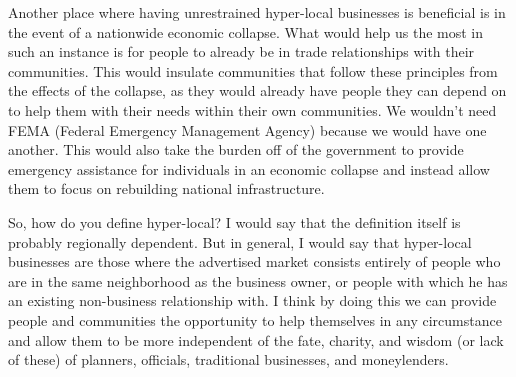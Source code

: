 Another place where having unrestrained hyper-local businesses is
beneficial is in the event of a nationwide economic collapse. What
would help us the
most in such an
instance is for people to already be in trade relationships with their
communities.  This
would insulate
communities that follow these principles from the effects
of the collapse, as
they would already
have people they can depend on
to help them with
their needs within their own communities. We
wouldn’t need FEMA
(Federal Emergency Management Agency) because we
would have one
another. This would
also take the burden off of the government to provide emergency
assistance for individuals in an economic collapse and instead allow
them to focus on rebuilding national
infrastructure.

So, how do you define hyper-local?  I would say that the definition
itself is probably regionally dependent. But in general, I would say
that hyper-local
businesses are those
where the advertised market consists entirely of people who are in the
same neighborhood as the business owner, or people with which he has an
existing non-business relationship with. I think by doing this we can
provide people and communities the opportunity to help themselves in
any circumstance and allow them to be more independent of the fate,
charity, and wisdom (or lack of these) of planners, officials,
traditional businesses, and moneylenders.
